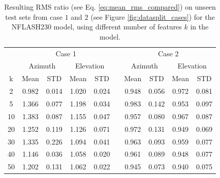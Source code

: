 \begin{table}[!htbp]
    \centering
    \caption{%
    Resulting RMS ratio (see Eq. \eqref{eq:mean_rms_compared}) on unseen test sets from case $1$ and $2$ (see Figure \ref{fig:datasplit_cases}) for the NFLASH230 model,
    using different number of features $k$ in the model.}
    \begin{tabular}{ccccc c cccc}
        \toprule
        \multicolumn{1}{c}{} & \multicolumn{4}{c}{Case 1} & & \multicolumn{4}{c}{Case 2} \\
        \cmidrule(lr){2-5} \cmidrule(lr){7-10}
        \multicolumn{1}{c}{} & \multicolumn{2}{c}{Azimuth} & \multicolumn{2}{c}{Elevation} & & \multicolumn{2}{c}{Azimuth} & \multicolumn{2}{c}{Elevation} \\ 
        \cmidrule(lr){2-5} \cmidrule(lr){7-10}
        k & Mean & STD & Mean & STD & & Mean & STD & Mean & STD \\ 
        \midrule
         2 &     0.982 &     0.014 &     1.020 &     0.024 &  &  0.948 &     0.056 &     0.972 &     0.081 \\
         5 &     1.366 &     0.077 &     1.198 &     0.034 &  &  0.983 &     0.142 &     0.953 &     0.097 \\
        10 &     1.383 &     0.087 &     1.155 &     0.047 &  &  0.957 &     0.080 &     0.967 &     0.087 \\
        20 &     1.252 &     0.119 &     1.126 &     0.071 &  &  0.972 &     0.131 &     0.949 &     0.069 \\
        30 &     1.335 &     0.226 &     1.094 &     0.041 &  &  0.963 &     0.093 &     0.959 &     0.077 \\
        40 &     1.146 &     0.036 &     1.058 &     0.020 &  &  0.961 &     0.089 &     0.948 &     0.077 \\
        50 &     1.202 &     0.131 &     1.062 &     0.022 &  &  0.945 &     0.073 &     0.940 &     0.075 \\
        \bottomrule
    \end{tabular}
    \label{tab:results_nflash_days}
\end{table}

